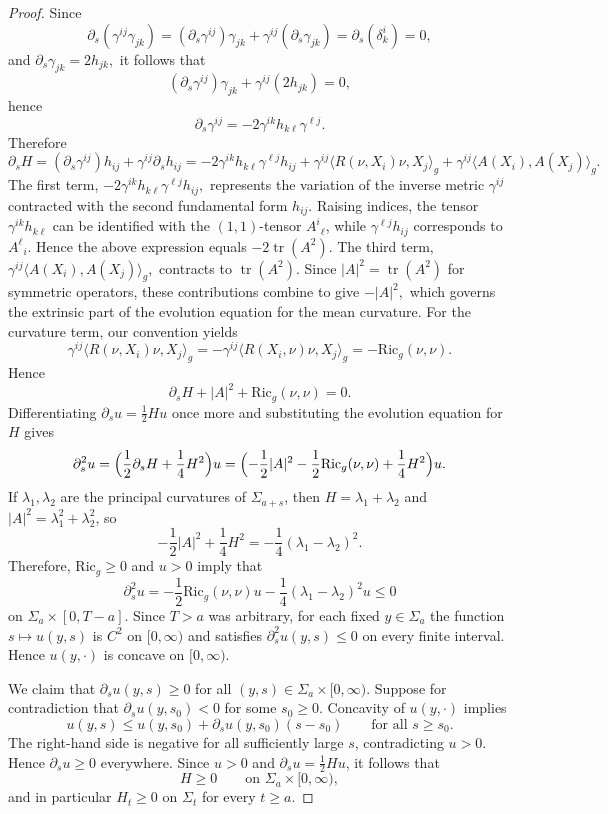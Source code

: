 \documentclass[12pt,oneside,a4paper]{article}
\theoremstyle{mytheorem}
\theoremstyle{remark}
\begin{document}
\begin{proof}
Since
\[
\partial_s(\gamma^{ij}\gamma_{jk})
=(\partial_s\gamma^{ij})\gamma_{jk}
+\gamma^{ij}(\partial_s\gamma_{jk})
=\partial_s(\delta^i_k)=0,
\]
and
$\partial_s\gamma_{jk}=2h_{jk},$ it follows that
\[
(\partial_s\gamma^{ij})\gamma_{jk}
+\gamma^{ij}(2h_{jk})=0,
\]
hence
\[
\partial_s\gamma^{ij}
=-2\gamma^{ik}h_{k\ell}\gamma^{\ell j}.
\]
Therefore
\[
\partial_sH=(\partial_s\gamma^{ij})h_{ij}+\gamma^{ij}\partial_sh_{ij}=-2\gamma^{ik}h_{k\ell}\gamma^{\ell j}h_{ij}+\gamma^{ij}\langle R(\nu,X_i)\nu,X_j\rangle_g+\gamma^{ij}\langle A(X_i),A(X_j)\rangle_g.
\]
The first term, $-2\gamma^{ik}h_{k\ell}\gamma^{\ell j}h_{ij},$
represents the variation of the inverse metric $\gamma^{ij}$ contracted with the second fundamental form $h_{ij}$. Raising indices, the tensor $\gamma^{ik}h_{k\ell}$ can be identified with the $(1,1)$-tensor $A^{i}{}_{\ell}$, while $\gamma^{\ell j}h_{ij}$ corresponds to $A^{\ell}{}_{i}$. Hence the above expression equals
$-2\operatorname{tr}(A^2).$ The third term,
$\gamma^{ij}\langle A(X_i),A(X_j)\rangle_g,$
contracts to
$\operatorname{tr}(A^2).$
 Since $|A|^2=\operatorname{tr}(A^2)$ for symmetric operators, these contributions combine to give $-|A|^2,$
which governs the extrinsic part of the evolution equation for the mean curvature.
For the curvature term, our convention yields
\[
\gamma^{ij} \langle R(\nu, X_i) \nu, X_j \rangle_g = -\gamma^{ij} \langle R(X_i, \nu) \nu, X_j \rangle_g=-\mathrm{Ric}_g(\nu,\nu).
\]
 Hence
\begin{equation}\label{Mean curvature}
\partial_sH+|A|^2+\mathrm{Ric}_g(\nu,\nu)=0.
\end{equation}
Differentiating $\partial_su=\frac12Hu$ once more and substituting the evolution equation for $H$ gives
\[
\partial_s^2u=\Bigl(\frac12\partial_sH+\frac14H^2\Bigr)u=\Bigl(-\frac12|A|^2-\frac12\mathrm{Ric}_g(\nu,\nu)+\frac14H^2\Bigr)u.
\]
If $\lambda_1,\lambda_2$ are the principal curvatures of $\Sigma_{a+s}$, then $H=\lambda_1+\lambda_2$ and $|A|^2=\lambda_1^2+\lambda_2^2$, so
\[
-\frac12|A|^2+\frac14H^2=-\frac14(\lambda_1-\lambda_2)^2.
\]
Therefore, $\mathrm{Ric}_g\geq 0$ and $u>0$ imply that
\[
\partial_s^2u=-\frac12\mathrm{Ric}_g(\nu,\nu)u-\frac14(\lambda_1-\lambda_2)^2u\le 0
\]
on $\Sigma_a\times[0,T-a]$. Since $T>a$ was arbitrary, for each fixed $y\in\Sigma_a$ the function $s\mapsto u(y,s)$ is $C^2$ on $[0,\infty)$ and satisfies $\partial_s^2u(y,s)\le 0$ on every finite interval. Hence $u(y,\cdot)$ is concave on $[0,\infty)$.

We claim that $\partial_su(y,s)\ge 0$ for all $(y,s)\in\Sigma_a\times[0,\infty)$. Suppose for contradiction that $\partial_su(y,s_0)<0$ for some $s_0\ge 0$. Concavity of $u(y,\cdot)$ implies
\[
u(y,s)\le u(y,s_0)+\partial_su(y,s_0)(s-s_0)\qquad\text{for all }s\ge s_0.
\]
The right-hand side is negative for all sufficiently large $s$, contradicting $u>0$. Hence $\partial_su\ge 0$ everywhere. Since $u>0$ and $\partial_su=\frac12Hu$, it follows that
\[
H\ge 0\qquad\text{on }\Sigma_a\times[0,\infty),
\]
and in particular $H_t\ge 0$ on $\Sigma_t$ for every $t\ge a$.


\end{proof}
\end{document}
